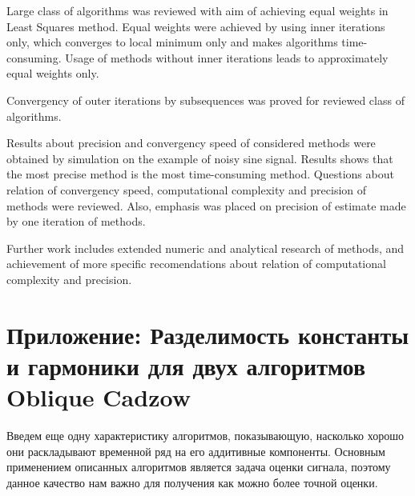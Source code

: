\documentclass[12pt,a4paper,fleqn,leqno]{article}
\begin{document}
Large class of algorithms was reviewed with aim of achieving equal weights in Least Squares method. Equal weights were achieved by using inner iterations only, which converges to local minimum only and makes algorithms time-consuming. Usage of methods without inner iterations leads to approximately equal weights only.

Convergency of outer iterations by subsequences was proved for reviewed class of algorithms.

Results about precision and convergency speed of considered methods were obtained by simulation on the example of noisy sine signal. Results shows that the most precise method is the most time-consuming method. Questions about relation of convergency speed, computational complexity and precision of methods were reviewed. Also, emphasis was placed on precision of estimate made by one iteration of methods.

Further work includes extended numeric and analytical research of methods, and achievement of more specific recomendations about relation of computational complexity and precision.

%



\section{Приложение: Разделимость константы и гармоники для двух алгоритмов Oblique Cadzow}
\label{sec:app}

Введем еще одну характеристику алгоритмов, показывающую, насколько хорошо они раскладывают временной ряд на его аддитивные компоненты. Основным применением описанных алгоритмов является задача оценки сигнала, поэтому данное качество нам важно для получения как можно более точной оценки.
\end{document}
